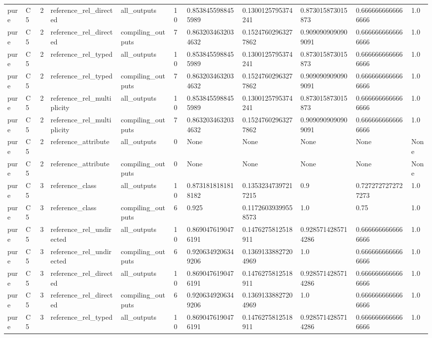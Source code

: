 \begin{tabular}{lllllllllll}
pure & C5 & 2 & reference\_rel\_directed & all\_outputs & 10 & 0.8538455988455989 & 0.1300125795374241 & 0.873015873015873 & 0.6666666666666666 & 1.0 \\
pure & C5 & 2 & reference\_rel\_directed & compiling\_outputs & 7 & 0.8632034632034632 & 0.15247602963277862 & 0.9090909090909091 & 0.6666666666666666 & 1.0 \\
pure & C5 & 2 & reference\_rel\_typed & all\_outputs & 10 & 0.8538455988455989 & 0.1300125795374241 & 0.873015873015873 & 0.6666666666666666 & 1.0 \\
pure & C5 & 2 & reference\_rel\_typed & compiling\_outputs & 7 & 0.8632034632034632 & 0.15247602963277862 & 0.9090909090909091 & 0.6666666666666666 & 1.0 \\
pure & C5 & 2 & reference\_rel\_multiplicity & all\_outputs & 10 & 0.8538455988455989 & 0.1300125795374241 & 0.873015873015873 & 0.6666666666666666 & 1.0 \\
pure & C5 & 2 & reference\_rel\_multiplicity & compiling\_outputs & 7 & 0.8632034632034632 & 0.15247602963277862 & 0.9090909090909091 & 0.6666666666666666 & 1.0 \\
pure & C5 & 2 & reference\_attribute & all\_outputs & 0 & None & None & None & None & None \\
pure & C5 & 2 & reference\_attribute & compiling\_outputs & 0 & None & None & None & None & None \\
pure & C5 & 3 & reference\_class & all\_outputs & 10 & 0.8731818181818182 & 0.13532347397217215 & 0.9 & 0.7272727272727273 & 1.0 \\
pure & C5 & 3 & reference\_class & compiling\_outputs & 6 & 0.925 & 0.11726039399558573 & 1.0 & 0.75 & 1.0 \\
pure & C5 & 3 & reference\_rel\_undirected & all\_outputs & 10 & 0.8690476190476191 & 0.1476275812518911 & 0.9285714285714286 & 0.6666666666666666 & 1.0 \\
pure & C5 & 3 & reference\_rel\_undirected & compiling\_outputs & 6 & 0.9206349206349206 & 0.13691338827204969 & 1.0 & 0.6666666666666666 & 1.0 \\
pure & C5 & 3 & reference\_rel\_directed & all\_outputs & 10 & 0.8690476190476191 & 0.1476275812518911 & 0.9285714285714286 & 0.6666666666666666 & 1.0 \\
pure & C5 & 3 & reference\_rel\_directed & compiling\_outputs & 6 & 0.9206349206349206 & 0.13691338827204969 & 1.0 & 0.6666666666666666 & 1.0 \\
pure & C5 & 3 & reference\_rel\_typed & all\_outputs & 10 & 0.8690476190476191 & 0.1476275812518911 & 0.9285714285714286 & 0.6666666666666666 & 1.0 \\

\end{tabular}
